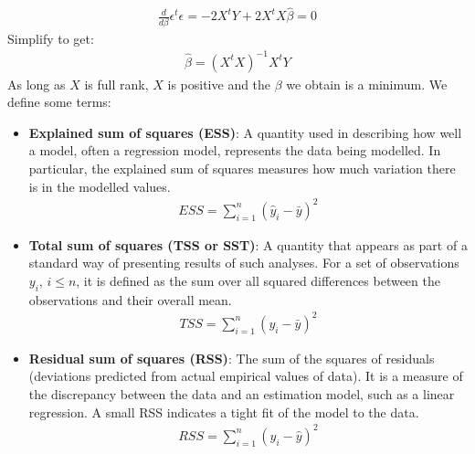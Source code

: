 \documentclass[notoc]{tufte-book}
\begin{document}
\begin{align}
    \frac{d}{d\beta}\epsilon^t\epsilon=-2X^tY+2X^tX\widehat\beta=0
\end{align}
Simplify to get:
\begin{align}
    \widehat\beta=(X^tX)^{-1}X^tY
\end{align}
As long as $X$ is full rank, $X$ is positive and the $\beta$ we obtain is a minimum. We define some terms:
\begin{itemize}
    \item \textbf{Explained sum of squares (ESS)}: A quantity used in describing how well a model, often a regression model, represents the data being modelled. In particular, the explained sum of squares measures how much variation there is in the modelled values.
    \begin{align}
        ESS=\sum_{i=1}^n(\widehat y_i-\bar y)^2
    \end{align}
    \item \textbf{Total sum of squares (TSS or SST)}: A quantity that appears as part of a standard way of presenting results of such analyses. For a set of observations $y_i$, $i \leq n$, it is defined as the sum over all squared differences between the observations and their overall mean.
    \begin{align}
        TSS=\sum_{i=1}^n(y_i-\bar y)^2
    \end{align}
    \item\textbf{Residual sum of squares (RSS)}: The sum of the squares of residuals (deviations predicted from actual empirical values of data). It is a measure of the discrepancy between the data and an estimation model, such as a linear regression. A small RSS indicates a tight fit of the model to the data.
    \begin{align}
        RSS=\sum_{i=1}^n(y_i-\widehat y)^2
    \end{align}
\end{itemize}
\end{document}
